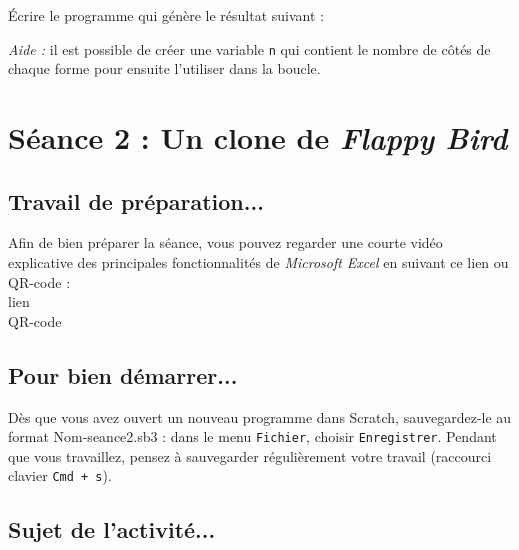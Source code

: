 Écrire le programme qui génère le résultat suivant :


\emph{Aide :} il est possible de créer une variable \texttt{n} qui contient le nombre de côtés de chaque forme pour ensuite l'utiliser dans la boucle.


\newpage 

%
%
%
%




\section{Séance 2 : Un clone de \emph{Flappy Bird}}\label{ficheScratch4e2}

\subsection{Travail de préparation...}

Afin de bien préparer la séance, vous pouvez regarder une courte vidéo explicative des principales fonctionnalités de \emph{Microsoft Excel} en suivant ce lien ou QR-code :\\

lien\\
QR-code

\subsection{Pour bien démarrer...}

Dès que vous avez ouvert un nouveau programme dans Scratch, sauvegardez-le au format Nom-seance2.sb3 : dans le menu \texttt{Fichier}, choisir \texttt{Enregistrer}. Pendant que vous travaillez, pensez à sauvegarder régulièrement votre travail (raccourci clavier \texttt{Cmd + s}).   


\subsection{Sujet de l'activité...}

\vspace{10pt}

